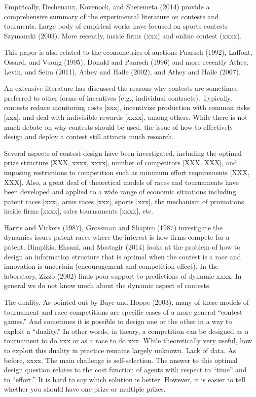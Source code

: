 \documentclass[10pt, titlepage]{article}
\begin{document}
Empirically, Dechenaux, Kovenock, and Sheremeta (2014) provide a
comprehensive summary of the experimental literature on contests and
tourments. Large body of empirical works have focused on sports contests
Szymanski (2003). More recently, inside firms (xxx) and online contest
(xxxx).

This paper is also related to the econometrics of auctions Paarsch
(1992), Laffont, Ossard, and Vuong (1995), Donald and Paarsch (1996) and
more recently Athey, Levin, and Seira (2011), Athey and Haile (2002),
and Athey and Haile (2007).

An extensive literature has discussed the reasons why contests are
sometimes preferred to other forms of incentives (e.g., individual
contracts). Typically, contests reduce monitoring costs {[}xxx{]},
incentivize production with common risks {[}xxx{]}, and deal with
indivisible rewards {[}xxxx{]}, among others. While there is not much
debate on why contests should be used, the issue of how to effectively
design and deploy a contest still attracts much research.

Several aspects of contest design have been investigated, including the
optimal prize structure {[}XXX, xxxx, xxxx{]}, number of competitors
{[}XXX, XXX{]}, and imposing restrictions to competition such as minimum
effort requirements {[}XXX, XXX{]}. Also, a great deal of theoretical
models of races and tournaments have been developed and applied to a
wide range of economic situations including patent races {[}xxx{]}, arms
races {[}xxx{]}, sports {[}xxx{]}, the mechanism of promotions inside
firms {[}xxxx{]}, sales tournaments {[}xxxx{]}, etc.

Harris and Vickers (1987), Grossman and Shapiro (1987) investigate the
dynamics issues patent races where the interest is how firms compete for
a patent. Bimpikis, Ehsani, and Mostagir (2014) looks at the problem of
how to design an information structure that is optimal when the contest
is a race and innovation is uncertain (encouragement and competition
effect). In the laboratory, Zizzo (2002) finds poor support to
predictions of dynamic xxxx. In general we do not know much about the
dynamic aspect of contests.

The duality. As pointed out by Baye and Hoppe (2003), many of these
models of tournament and race competitions are specific cases of a more
general ``contest games.'' And sometimes it is possible to design one or
the other in a way to exploit a ``duality.'' In other words, in theory,
a competition can be designed as a tournament to do xxx or as a race to
do xxx. While theoretically very useful, how to exploit this duality in
practice remains largely unknown. Lack of data. As before, xxxx. The
main challenge is self-selection. The answer to this optimal design
question relates to the cost function of agents with respect to ``time''
and to ``effort.'' It is hard to say which solution is better. However,
it is easier to tell whether you should have one prize or multiple
prizes.
\end{document}

